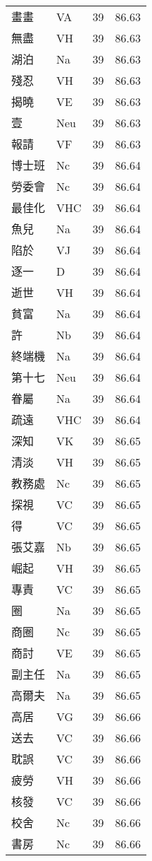 \documentclass[twocolumn]{book}
\begin{document}
\begin{supertabular}{llrr}
畫畫 & VA & 39 &  86.63\\
無盡 & VH & 39 &  86.63\\
湖泊 & Na & 39 &  86.63\\
殘忍 & VH & 39 &  86.63\\
揭曉 & VE & 39 &  86.63\\
壹 & Neu & 39 &  86.63\\
報請 & VF & 39 &  86.63\\
博士班 & Nc & 39 &  86.64\\
勞委會 & Nc & 39 &  86.64\\
最佳化 & VHC & 39 &  86.64\\
魚兒 & Na & 39 &  86.64\\
陷於 & VJ & 39 &  86.64\\
逐一 & D & 39 &  86.64\\
逝世 & VH & 39 &  86.64\\
貧富 & Na & 39 &  86.64\\
許 & Nb & 39 &  86.64\\
終端機 & Na & 39 &  86.64\\
第十七 & Neu & 39 &  86.64\\
眷屬 & Na & 39 &  86.64\\
疏遠 & VHC & 39 &  86.64\\
深知 & VK & 39 &  86.65\\
清淡 & VH & 39 &  86.65\\
教務處 & Nc & 39 &  86.65\\
探視 & VC & 39 &  86.65\\
得 & VC & 39 &  86.65\\
張艾嘉 & Nb & 39 &  86.65\\
崛起 & VH & 39 &  86.65\\
專責 & VC & 39 &  86.65\\
圈 & Na & 39 &  86.65\\
商圈 & Nc & 39 &  86.65\\
商討 & VE & 39 &  86.65\\
副主任 & Na & 39 &  86.65\\
高爾夫 & Na & 39 &  86.65\\
高居 & VG & 39 &  86.66\\
送去 & VC & 39 &  86.66\\
耽誤 & VC & 39 &  86.66\\
疲勞 & VH & 39 &  86.66\\
核發 & VC & 39 &  86.66\\
校舍 & Nc & 39 &  86.66\\
書房 & Nc & 39 &  86.66\\

\end{supertabular}
\end{document}
